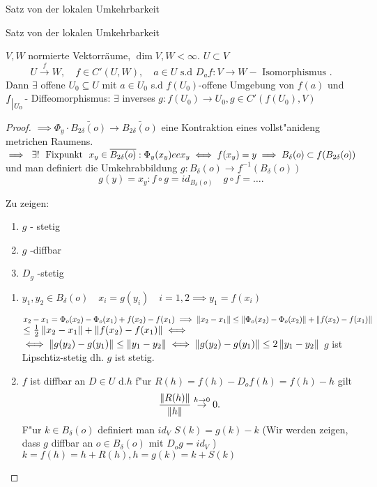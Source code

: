 \documentclass[class=article, crop=false]{standalone}
\begin{document}
\begin{zettel}{Satz von der lokalen Umkehrbarkeit}

\begin{flashcard}[svvujhnu]{Satz von der lokalen Umkehrbarkeit}
	\begin{theorem}
		$V,W$ normierte Vektorräume, $\dim V,W < \infty$.  $U \subset V$
		\[
			U \stackrel{f}{\to} W,\quad f \in C'(U,W),\quad a \in U \text{ s.d } D_af: V \to W - \text{ Isomorphismus }
		.\]
		Dann $\exists $ offene $U_0 \subseteq U$ mit $a \in U_0$ s.d $f( U_0 ) $-offene Umgebung von $f( a ) $ und $f _{\big{|_{U_0}}} $- Diffeomorphismus: $\exists $ inverses $g : f( U_0 ) \to U_0, g \in C'(f(U_0),V) $
	\end{theorem}
\end{flashcard}

\begin{proof}
	$\implies \Phi_y \cdot  \bar{B_{2\delta}(o)} \to  \bar{B_{2\delta}(o)}$ eine Kontraktion eines vollst"anideng metrichen Raumens. $\implies  \exists ! \tx{ Fixpunkt } x_y \in \bar{B_{2\delta}(o)}: \Phi_y(x_y) ee x_y \iff  f(x_y)= y \implies  B_{\delta}(o) \subset  f (B_{2\delta}(o)) $ und man definiert die Umkehrabbildung $g: B_{\delta}(o) \to  f^{-1}(B_{\delta}(o))$
	\[
		g(y) = x_y: f \circ  g = id_{B_{\delta}(o)} \quad g \circ  f = \dots
	.\]

	Zu zeigen:
	\begin{enumerate}
		\item $g$ - stetig
		\item $g$ -diffbar
		\item $D_g$ -stetig
	\end{enumerate}

	\begin{enumerate}
		\item $y_1, y_2 \in  B_{\delta}(o) \quad x_i = g(y_i) \quad i =1,2 \implies y_1 = f(x_i)$

		      $x_2 - x_1 = \Phi_o(x_2) - \Phi_o(x_1) + f(x_2) - f(x_1) \implies \left\|x_2 - x_1\right\| \leq  \left\|\Phi_o(x_2) - \Phi_o(x_2)\right\| + \left\| f(x_2) - f(x_1)\right\|$ $\leq  \frac{1}{2} \left\|x_2-x_1\right\| + \left\| f(x_2) - f(x_1)\right\| \iff $
		      $\iff \left\|g(y_2) - g(y_1)\right\| \leq  \left\|y_1 - y_2\right\| \iff \left\|g(y_2) - g(y_1)\right\| \leq 2\left\|y_1-y_2\right\|$
		      $g$ ist Lipschtiz-stetig dh. $g$ ist stetig.

		\item $f$ ist diffbar an $D \in  U$ d.$h$ f"ur $R(h) = f(h) - D_o f(h) = f(h) - h$  gilt
		      \[
			      \frac{\left\|R(h)\right\|}{\left\|h\right\|} \stackrel{h \to  0}{\to} 0
		      .\]
		      F"ur $k \in  B_{\delta}(o)$ definiert man $id_V$ $S(k) = g(k) - k $
		      (Wir werden zeigen, dass $g$ diffbar an $o \in  B_{\delta}(o)$ mit $D_o g = id_V$ )\\
		      $k = f(h) = h + R(h), h = g(k) = k + S(k)$


\end{enumerate}
\end{proof}
\end{zettel}
\end{document}
